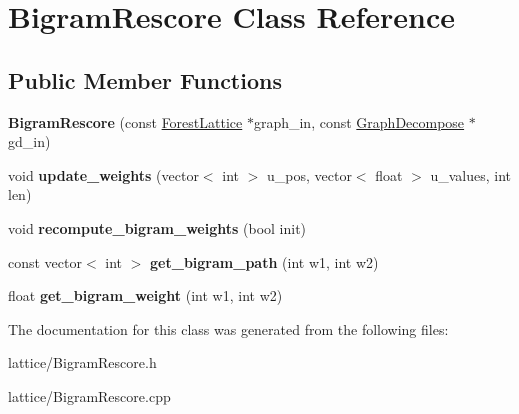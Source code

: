 \hypertarget{classBigramRescore}{
\section{BigramRescore Class Reference}
\label{classBigramRescore}
}
\subsection*{Public Member Functions}
\begin{DoxyCompactItemize}
\item 
\hypertarget{classBigramRescore_ac1fc6a3f7ac90cbf158e6bcd2f6518f8}{
{\bfseries BigramRescore} (const \hyperlink{classForestLattice}{ForestLattice} $\ast$graph\_\-in, const \hyperlink{classGraphDecompose}{GraphDecompose} $\ast$gd\_\-in)}
\label{classBigramRescore_ac1fc6a3f7ac90cbf158e6bcd2f6518f8}

\item 
\hypertarget{classBigramRescore_a2d3ec18a2decf6adbb92c2a044505041}{
void {\bfseries update\_\-weights} (vector$<$ int $>$ u\_\-pos, vector$<$ float $>$ u\_\-values, int len)}
\label{classBigramRescore_a2d3ec18a2decf6adbb92c2a044505041}

\item 
\hypertarget{classBigramRescore_a25b5c1d281493c722ae1c0a02171d5ec}{
void {\bfseries recompute\_\-bigram\_\-weights} (bool init)}
\label{classBigramRescore_a25b5c1d281493c722ae1c0a02171d5ec}

\item 
\hypertarget{classBigramRescore_a726d2e7088c39e26d924038e223e297c}{
const vector$<$ int $>$ {\bfseries get\_\-bigram\_\-path} (int w1, int w2)}
\label{classBigramRescore_a726d2e7088c39e26d924038e223e297c}

\item 
\hypertarget{classBigramRescore_a4ddc874583100444b08e97c44038f743}{
float {\bfseries get\_\-bigram\_\-weight} (int w1, int w2)}
\label{classBigramRescore_a4ddc874583100444b08e97c44038f743}

\end{DoxyCompactItemize}


The documentation for this class was generated from the following files:\begin{DoxyCompactItemize}
\item 
lattice/BigramRescore.h\item 
lattice/BigramRescore.cpp\end{DoxyCompactItemize}
